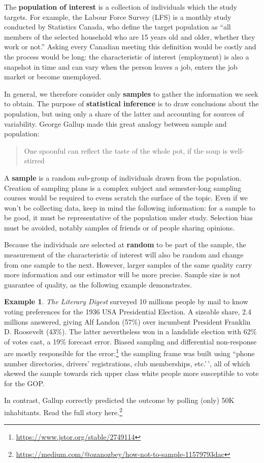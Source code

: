 \documentclass[
  11pt,
  letterpaper,
]{book}
\renewcommand{\href}[2]{#2\footnote{\url{#1}}}
\theoremstyle{definition}
\theoremstyle{definition}
\newtheorem{example}{Example}[chapter]
\theoremstyle{definition}
\theoremstyle{definition}
\theoremstyle{remark}
\begin{document}
The \textbf{population of interest} is a collection of individuals which the study targets. For example, the Labour Force Survey (LFS) is a monthly study conducted by Statistics Canada, who define the target population as ``all members of the selected household who are 15 years old and older, whether they work or not.'' Asking every Canadian meeting this definition would be costly and the process would be long: the characteristic of interest (employment) is also a snapshot in time and can vary when the person leaves a job, enters the job market or become unemployed.

In general, we therefore consider only \textbf{samples} to gather the information we seek to obtain. The purpose of \textbf{statistical inference} is to draw conclusions about the population, but using only a share of the latter and accounting for sources of variability. George Gallup made this great analogy between sample and population:

\begin{quote}
One spoonful can reflect the taste of the whole pot, if the soup is well-stirred
\end{quote}

A \textbf{sample} is a random sub-group of individuals drawn from the population. Creation of sampling plans is a complex subject and semester-long sampling courses would be required to evens scratch the surface of the topic. Even if we won't be collecting data, keep in mind the following information: for a sample to be good, it must be representative of the population under study. Selection bias must be avoided, notably samples of friends or of people sharing opinions.

Because the individuals are selected at \textbf{random} to be part of the sample, the measurement of the characteristic of interest will also be random and change from one sample to the next. However, larger samples of the same quality carry more information and our estimator will be more precise. Sample size is not guarantee of quality, as the following example demonstrates.

\begin{example}
\protect\hypertarget{exm:Galluppoll}{}{\label{exm:Galluppoll} }
\emph{The Literary Digest} surveyed 10 millions people by mail to know voting preferences for the 1936 USA Presidential Election. A sizeable share, 2.4 millions answered, giving Alf Landon (57\%) over incumbent President Franklin D. Roosevelt (43\%). The latter nevertheless won in a landslide election with 62\% of votes cast, a 19\% forecast error. \href{https://www.jstor.org/stable/2749114}{Biased sampling and differential non-response are mostly responsible for the error:} the sampling frame was built using ``phone number directories, drivers' registrations, club memberships, etc.'\,', all of which skewed the sample towards rich upper class white people more susceptible to vote for the GOP.

In contrast, Gallup correctly predicted the outcome by polling (only) 50K inhabitants. \href{https://medium.com/@ozanozbey/how-not-to-sample-11579793dac}{Read the full story here.}
\end{example}
\end{document}

